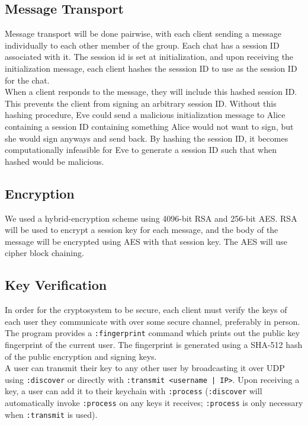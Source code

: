 \documentclass{scrartcl}
\begin{document}
\subsection{Message Transport}
Message transport will be done pairwise, with each client sending a message individually to each other member of the group. Each chat has a session ID associated with it. The session id is set at initialization, and upon receiving the initialization message, each client hashes the sesssion ID to use as the session ID for the chat.\\

When a client responds to the message, they will include this hashed session ID. This prevents the client from signing an arbitrary session ID. Without this hashing procedure, Eve could send a malicious initialization message to Alice containing a session ID containing something Alice would not want to sign, but she would sign anyways and send back. By hashing the session ID, it becomes computationally infeasible for Eve to generate a session ID such that when hashed would be malicious.

\subsection{Encryption}
We used a hybrid-encryption scheme using 4096-bit RSA and 256-bit AES. RSA will be used to encrypt a session key for each message, and the body of the message will be encrypted using AES with that session key. The AES will use cipher block chaining.\\

\subsection{Key Verification}
In order for the cryptosystem to be secure, each client must verify the keys of each user they communicate with over some secure channel, preferably in person. The program provides a \texttt{:fingerprint} command which prints out the public key fingerprint of the current user. The fingerprint is generated using a SHA-512 hash of the public encryption and signing keys.\\

A user can transmit their key to any other user by broadcasting it over UDP using \texttt{:discover} or directly with \texttt{:transmit <username | IP>}. Upon receiving a key, a user can add it to their keychain with \texttt{:process} (\texttt{:discover} will automatically invoke \texttt{:process} on any keys it receives; \texttt{:process} is only necessary when \texttt{:transmit} is used).\\
\end{document}
